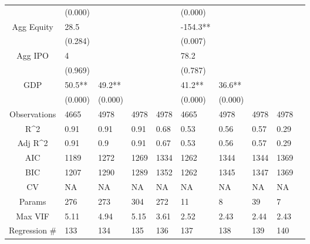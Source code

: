 \documentclass{article}
\begin{document}
\begin{table}[H]
\begin{tabular}{|clllllllll|}
   & (0.000) &  &  &  & (0.000) &  &  &  & \\
  Agg Equity & 28.5 &  &  &  & -154.3** &  &  &  & \\
   & (0.284) &  &  &  & (0.007) &  &  &  & \\
  Agg IPO & 4 &  &  &  & 78.2 &  &  &  & \\
   & (0.969) &  &  &  & (0.787) &  &  &  & \\
  GDP & 50.5** & 49.2** &  &  & 41.2** & 36.6** &  &  & \\
   & (0.000) & (0.000) &  &  & (0.000) & (0.000) &  &  & \\
  \hline
 Observations & 4665 & 4978 & 4978 & 4978 & 4665 & 4978 & 4978 & 4978 & \\
  R^2 & 0.91 & 0.91 & 0.91 & 0.68 & 0.53 & 0.56 & 0.57 & 0.29 & \\
  Adj R^2 & 0.91 & 0.9 & 0.91 & 0.67 & 0.53 & 0.56 & 0.57 & 0.29 & \\
  AIC & 1189 & 1272 & 1269 & 1334 & 1262 & 1344 & 1344 & 1369 & \\
  BIC & 1207 & 1290 & 1289 & 1352 & 1262 & 1345 & 1347 & 1369 & \\
  CV & NA & NA & NA & NA & NA & NA & NA & NA & \\
  Params & 276 & 273 & 304 & 272 & 11 & 8 & 39 & 7 & \\
  Max VIF & 5.11 & 4.94 & 5.15 & 3.61 & 2.52 & 2.43 & 2.44 & 2.43 & \\
  Regression \# & 133 & 134 & 135 & 136 & 137 & 138 & 139 & 140 & \\
   \hline
\end{tabular}

\end{table}
\end{document}
